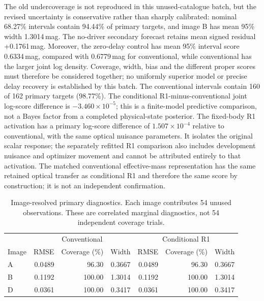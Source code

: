 The old undercoverage is not reproduced in this unused-catalogue batch, but the revised uncertainty is conservative rather than sharply calibrated: nominal 68.27\% intervals contain 94.44\% of primary targets, and image B has mean 95\% width 1.3014\,mag. The no-driver secondary forecast retains mean signed residual +0.1761\,mag. Moreover, the zero-delay control has mean 95\% interval score 0.6334\,mag, compared with 0.6779\,mag for conventional, while conventional has the larger joint log density. Coverage, width, bias and the different proper scores must therefore be considered together; no uniformly superior model or precise delay recovery is established by this batch.
The conventional intervals contain 160 of 162 primary targets (98.77\%). The conditional R1-minus-conventional joint log-score difference is \(-3.460\times10^{-5}\); this is a finite-model predictive comparison, not a Bayes factor from a completed physical-state posterior.
The fixed-body R1 activation has a primary log-score difference of \(1.507\times10^{-4}\) relative to conventional, with the same optical nuisance parameters. It isolates the original scalar response; the separately refitted R1 comparison also includes development nuisance and optimizer movement and cannot be attributed entirely to that activation.
The matched conventional effective-mass representation has the same retained optical transfer as conditional R1 and therefore the same score by construction; it is not an independent confirmation.
\begin{table}[t]
\caption{Image-resolved primary diagnostics. Each image contributes 54 unused observations. These are correlated marginal diagnostics, not 54 independent coverage trials.}\label{tab:he0435-revised-images}
\centering\small\begin{tabular}{lrrr|rrr}\toprule
&\multicolumn{3}{c}{Conventional}&\multicolumn{3}{c}{Conditional R1}\\
Image & RMSE & Coverage (\%) & Width & RMSE & Coverage (\%) & Width\\\midrule
A & 0.0489 & 96.30 & 0.3667 & 0.0489 & 96.30 & 0.3667\\
B & 0.1192 & 100.00 & 1.3014 & 0.1192 & 100.00 & 1.3014\\
D & 0.0361 & 100.00 & 0.3417 & 0.0361 & 100.00 & 0.3417\\
\bottomrule\end{tabular}
\end{table}

